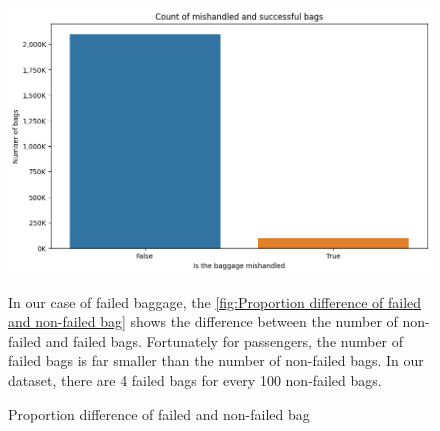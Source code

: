 \documentclass[12pt]{article}
\begin{document}
\begin{figure}[htbp]
    \centering
    \begin{minipage}{0.55\textwidth}
        \centering
        \includegraphics[width=\textwidth]{is_failed unbalanced.png} %
        \caption{Proportion difference of failed and non-failed bag}
        \label{fig:Proportion difference of failed and non-failed bag}
    \end{minipage}
    \hfill
    \begin{minipage}{0.3\textwidth}
        In our case of failed baggage, the \autoref{fig:Proportion difference of failed and non-failed bag} shows the difference between the number of non-failed and failed bags. Fortunately for passengers, the number of failed bags is far smaller than the number of non-failed bags. In our dataset, there are 4 failed bags for every 100 non-failed bags.
    \end{minipage}
\end{figure}
\end{document}
